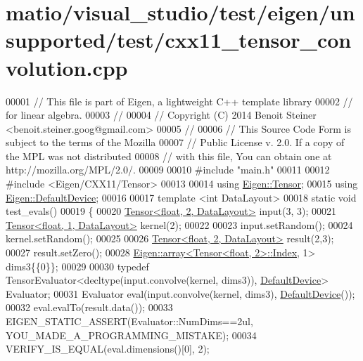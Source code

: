 \hypertarget{matio_2visual__studio_2test_2eigen_2unsupported_2test_2cxx11__tensor__convolution_8cpp_source}{}\section{matio/visual\+\_\+studio/test/eigen/unsupported/test/cxx11\+\_\+tensor\+\_\+convolution.cpp}
\label{matio_2visual__studio_2test_2eigen_2unsupported_2test_2cxx11__tensor__convolution_8cpp_source}

\begin{DoxyCode}
00001 \textcolor{comment}{// This file is part of Eigen, a lightweight C++ template library}
00002 \textcolor{comment}{// for linear algebra.}
00003 \textcolor{comment}{//}
00004 \textcolor{comment}{// Copyright (C) 2014 Benoit Steiner <benoit.steiner.goog@gmail.com>}
00005 \textcolor{comment}{//}
00006 \textcolor{comment}{// This Source Code Form is subject to the terms of the Mozilla}
00007 \textcolor{comment}{// Public License v. 2.0. If a copy of the MPL was not distributed}
00008 \textcolor{comment}{// with this file, You can obtain one at http://mozilla.org/MPL/2.0/.}
00009 
00010 \textcolor{preprocessor}{#include "main.h"}
00011 
00012 \textcolor{preprocessor}{#include <Eigen/CXX11/Tensor>}
00013 
00014 \textcolor{keyword}{using} \hyperlink{class_eigen_1_1_tensor}{Eigen::Tensor};
00015 \textcolor{keyword}{using} \hyperlink{struct_eigen_1_1_default_device}{Eigen::DefaultDevice};
00016 
00017 \textcolor{keyword}{template} <\textcolor{keywordtype}{int} DataLayout>
00018 \textcolor{keyword}{static} \textcolor{keywordtype}{void} test\_evals()
00019 \{
00020   \hyperlink{class_eigen_1_1_tensor}{Tensor<float, 2, DataLayout>} input(3, 3);
00021   \hyperlink{class_eigen_1_1_tensor}{Tensor<float, 1, DataLayout>} kernel(2);
00022 
00023   input.setRandom();
00024   kernel.setRandom();
00025 
00026   \hyperlink{class_eigen_1_1_tensor}{Tensor<float, 2, DataLayout>} result(2,3);
00027   result.setZero();
00028   \hyperlink{class_eigen_1_1array}{Eigen::array<Tensor<float, 2>::Index}, 1> dims3\{\{0\}\};
00029 
00030   \textcolor{keyword}{typedef} TensorEvaluator<decltype(input.convolve(kernel, dims3)), \hyperlink{struct_eigen_1_1_default_device}{DefaultDevice}> Evaluator;
00031   Evaluator eval(input.convolve(kernel, dims3), \hyperlink{struct_eigen_1_1_default_device}{DefaultDevice}());
00032   eval.evalTo(result.data());
00033   EIGEN\_STATIC\_ASSERT(Evaluator::NumDims==2ul, YOU\_MADE\_A\_PROGRAMMING\_MISTAKE);
00034   VERIFY\_IS\_EQUAL(eval.dimensions()[0], 2);

\end{DoxyCode}
